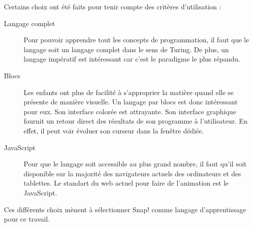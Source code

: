 Certains choix ont été faits pour tenir compte des critères d'utilisation :
\begin{description}
  \item[Langage complet] Pour pouvoir apprendre tout les concepts de programmation, il faut que le langage soit un langage complet dans le sens de Turing.  De plus, un langage impératif est intéressant car c'est le paradigme le plus répandu.
  \item[Blocs] Les enfants ont plus de facilité à s'approprier la matière quand elle se présente de manière visuelle. %
  Un langage par blocs est donc intéressant pour eux. Son interface colorée est attrayante. Son interface graphique fournit un retour direct des résultats de son programme à l'utilisateur. En effet, il peut voir évoluer son curseur dans la fenêtre dédiée.
  \item[JavaScript] Pour que le langage soit accessible au plus grand nombre, il faut qu'il soit disponible sur la majorité des navigateurs actuels des ordinateurs et des tablettes. Le standart du web actuel pour faire de l'animation est le JavaScript.
\end{description}
Ces différents choix mènent à sélectionner Snap! comme langage d'apprentissage pour ce travail.


